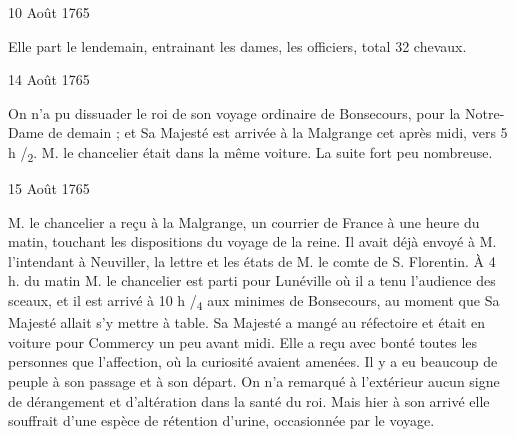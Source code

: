                      \begin{diary}{10 Août 1765}{}

                         Elle part le lendemain, entrainant les
                           dames,
                           les officiers, total 32 chevaux. \bigskip


                     \end{diary}

                     \begin{diary}{14 Août 1765}{}

                         On n'a pu dissuader le roi de son voyage
                           ordinaire de Bonsecours, pour la Notre-Dame de
                           demain ; et Sa Majesté est arrivée à la
                              Malgrange
                           cet après midi, vers 5 h /\textsubscript{2}. M. le chancelier
                           était dans la même voiture. La suite fort
                           peu nombreuse. \bigskip


                     \end{diary}



                     \begin{diary}{15 Août 1765}{}


                           M. le chancelier a reçu à
                              la Malgrange,
                           un courrier de France à une heure du matin,
                           touchant les dispositions du voyage de la
                              reine. Il avait déjà envoyé à M. l'intendant
                           à Neuviller, la lettre et
                           les états de M. le
                              comte de S. Florentin. À 4 h. du matin
                           M. le chancelier est parti
                           pour Lunéville
                           où il a tenu l'audience des sceaux, et il
                           est arrivé à 10 h /\textsubscript{4} aux
                              minimes de
                              Bonsecours,
                           au moment que Sa Majesté allait
                           s'y mettre à table. Sa Majesté a mangé au
                           réfectoire et était en voiture pour Commercy
                           un peu avant midi. Elle a reçu avec
                           bonté toutes les personnes que l'affection,
                           où la curiosité avaient amenées. Il y a
                           eu beaucoup de peuple à son passage et à
                           son départ. On n'a remarqué à l'extérieur
                           aucun signe de dérangement et d'altération
                           dans la santé du roi. Mais
                           hier à
                           son arrivé elle souffrait d'une espèce
                           de rétention d'urine, occasionnée par le
                           voyage. \bigskip


                     \end{diary}

